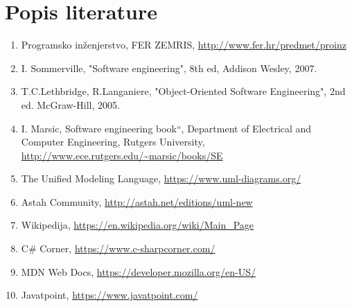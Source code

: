\chapter*{Popis literature}
	 	
%	
%		
		
		\begin{enumerate}
			
			
			\item  Programsko inženjerstvo, FER ZEMRIS, \url{http://www.fer.hr/predmet/proinz}
			
			\item  I. Sommerville, "Software engineering", 8th ed, Addison Wesley, 2007.
			
			\item  T.C.Lethbridge, R.Langaniere, "Object-Oriented Software Engineering", 2nd ed. McGraw-Hill, 2005.
			
			\item  I. Marsic, Software engineering book``, Department of Electrical and Computer Engineering, Rutgers University, \url{http://www.ece.rutgers.edu/~marsic/books/SE}
			
			\item  The Unified Modeling Language, \url{https://www.uml-diagrams.org/}
			
			\item  Astah Community, \url{http://astah.net/editions/uml-new}
			
%			
%			
			
			\item Wikipedija, \url{https://en.wikipedia.org/wiki/Main_Page}
			
			\item C\# Corner, \url{https://www.c-sharpcorner.com/}
			
			\item MDN Web Docs, \url{https://developer.mozilla.org/en-US/}
			
			\item Javatpoint, \url{https://www.javatpoint.com/}
		\end{enumerate}
		
		 